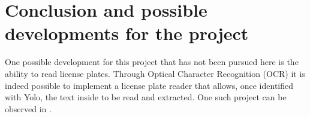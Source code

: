 \documentclass[12pt]{article}
\begin{document}
\section{Conclusion and possible developments for the project}
One possible development for this project that has not been pursued here is the ability to read license plates. Through Optical Character Recognition (OCR) it is indeed possible to implement a license plate reader that allows, once identified with Yolo, the text inside to be read and extracted. One such project can be observed in \cite{github1}.


\clearpage


\begin{flushleft}
  
\end{flushleft}

\end{document}
